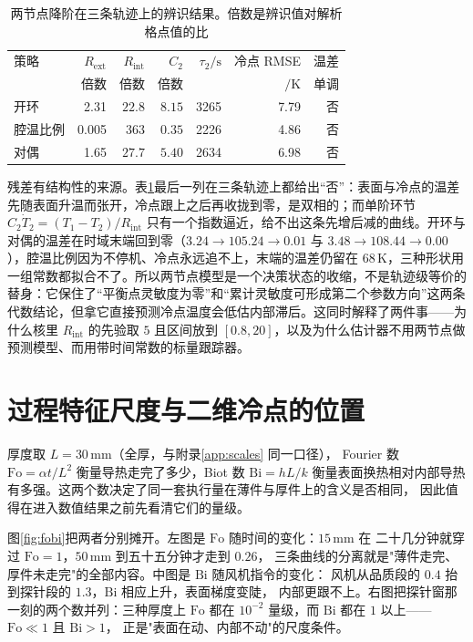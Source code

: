 \begin{table}[htbp]
\centering
\caption{两节点降阶在三条轨迹上的辨识结果。倍数是辨识值对解析格点值的比}
\label{tab:redfit}
\setlength{\tabcolsep}{2.4pt}
{\footnotesize
\begin{tabular}{lrrrrrr}
\toprule
策略 & \(R_{\mathrm{ext}}\) & \(R_{\mathrm{int}}\) & \(C_2\) & \(\tau_2/\mathrm{s}\) & 冷点 RMSE & 温差 \\
     & 倍数 & 倍数 & 倍数 & & \(/\mathrm{K}\) & 单调 \\
\midrule
开环 & 2.31 & \(22.8\) & \(8.15\) & 3265 & 7.79 & 否 \\
腔温比例 & 0.005 & \(363\) & \(0.35\) & 2226 & 4.86 & 否 \\
对偶 & 1.65 & \(27.7\) & \(5.40\) & 2634 & 6.98 & 否 \\
\bottomrule
\end{tabular}}
\end{table}

残差有结构性的来源。表\ref{tab:redfit}{}最后一列在三条轨迹上都给出“否”：表面与冷点的温差先随表面升温而张开，冷点跟上之后再收拢到零，是双相的；而单阶环节 \(C_2\dot T_2=(T_1-T_2)/R_{\mathrm{int}}\) 只有一个指数逼近，给不出这条先增后减的曲线。开环与对偶的温差在时域末端回到零（\(3.24\to105.24\to0.01\) 与 \(3.48\to108.44\to0.00\)），腔温比例因为不停机、冷点永远追不上，末端的温差仍留在 \(68\,\mathrm{K}\)，三种形状用一组常数都拟合不了。所以两节点模型是一个决策状态的收缩，不是轨迹级等价的替身：它保住了“平衡点灵敏度为零”和“累计灵敏度可形成第二个参数方向”这两条代数结论，但拿它直接预测冷点温度会低估内部滞后。这同时解释了两件事——为什么核里 \(R_{\mathrm{int}}\) 的先验取 \(5\) 且区间放到 \([0.8,20]\)，以及为什么估计器不用两节点做预测模型、而用带时间常数的标量跟踪器。

\section{过程特征尺度与二维冷点的位置}

厚度取 \(L=30\,\mathrm{mm}\)（全厚，与附录\ref{app:scales} 同一口径），
Fourier 数 \(\mathrm{Fo}=\alpha t/L^2\) 衡量导热走完了多少，Biot 数 \(\mathrm{Bi}=hL/k\)
衡量表面换热相对内部导热有多强。这两个数决定了同一套执行量在薄件与厚件上的含义是否相同，
因此值得在进入数值结果之前先看清它们的量级。

图\ref{fig:fobi}{}把两者分别摊开。左图是 \(\mathrm{Fo}\) 随时间的变化：\(15\,\mathrm{mm}\) 在
二十几分钟就穿过 \(\mathrm{Fo}=1\)，\(50\,\mathrm{mm}\) 到五十五分钟才走到 \(0.26\)，
三条曲线的分离就是"薄件走完、厚件未走完"的全部内容。中图是 \(\mathrm{Bi}\) 随风机指令的变化：
风机从品质段的 \(0.4\) 抬到探针段的 \(1.3\)，\(\mathrm{Bi}\) 相应上升，表面梯度变陡，
内部更跟不上。右图把探针窗那一刻的两个数并列：三种厚度上 \(\mathrm{Fo}\) 都在 \(10^{-2}\)
量级，而 \(\mathrm{Bi}\) 都在 \(1\) 以上——\(\mathrm{Fo}\ll1\) 且 \(\mathrm{Bi}>1\)，
正是"表面在动、内部不动"的尺度条件。

